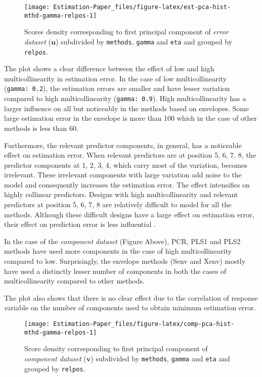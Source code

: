 \documentclass[12pt,3p,authoryear]{elsarticle}
\begin{document}
\begin{figure}[!htb]
\texttt{[image: Estimation-Paper\_files/figure-latex/est-pca-hist-mthd-gamma-relpos-1]} \caption{Scores density corresponding to first principal component
of \emph{error dataset} (\(\mathbf{u}\)) subdivided by \texttt{methods},
\texttt{gamma} and \texttt{eta} and grouped by \texttt{relpos}.}\label{fig:est-pca-hist-mthd-gamma-relpos}
\end{figure}

The plot shows a clear difference between the effect of low and high
multicollinearity in estimation error. In the case of low
multicollinearity (\texttt{gamma:\ 0.2}), the estimation errors are
smaller and have lesser variation compared to high multicollinearity
(\texttt{gamma:\ 0.9}). High multicollinearity has a larger influence on
all but noticeably in the methods based on envelopes. Some large
estimation error in the envelope is more than 100 which in the case of
other methods is less than 60.

Furthermore, the relevant predictor components, in general, has a
noticeable effect on estimation error. When relevant predictors are at
position 5, 6, 7, 8, the predictor components at 1, 2, 3, 4, which carry
most of the variation, becomes irrelevant. These irrelevant components
with large variation add noise to the model and consequently increases
the estimation error. The effect intensifies on highly collinear
predictors. Designs with high multicollinearity and relevant predictors
at position 5, 6, 7, 8 are relatively difficult to model for all the
methods. Although these difficult designs have a large effect on
estimation error, their effect on prediction error is less influential
\citep{rimal2019pred}.






In the case of the \emph{component dataset} (Figure Above), PCR, PLS1
and PLS2 methods have used more components in the case of high
multicollinearity compared to low. Surprisingly, the envelope methods
(Senv and Xenv) mostly have used a distinctly lesser number of
components in both the cases of multicollinearity compared to other
methods.

The plot also shows that there is no clear effect due to the correlation
of response variable on the number of components used to obtain minimum
estimation error.

\begin{figure}[!htb]
\texttt{[image: Estimation-Paper\_files/figure-latex/comp-pca-hist-mthd-gamma-relpos-1]} \caption{Score density corresponding to first principal component
of \emph{component dataset} (\(\mathbf{v}\)) subdivided by
\texttt{methods}, \texttt{gamma} and \texttt{eta} and grouped by
\texttt{relpos}.}\label{fig:comp-pca-hist-mthd-gamma-relpos}
\end{figure}
\end{document}

